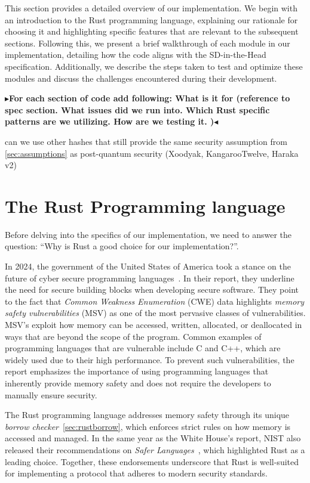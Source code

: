 \documentclass[11pt]{report}
\theoremstyle{definition}
\theoremstyle{plain}
\newcommand{\todo}[1]{{\color[rgb]{.5,0,0}\textbf{$\blacktriangleright$#1$\blacktriangleleft$}}}
\begin{document}
This section provides a detailed overview of our implementation. We begin with an introduction to the Rust programming language, explaining our rationale for choosing it and highlighting specific features that are relevant to the subsequent sections. Following this, we present a brief walkthrough of each module in our implementation, detailing how the code aligns with the SD-in-the-Head specification. Additionally, we describe the steps taken to test and optimize these modules and discuss the challenges encountered during their development.

\todo{For each section of code add following: What is it for (reference to spec section. What issues did we run into. Which Rust specific patterns are we utilizing. How are we testing it. )}

can we use other hashes that still provide the same security assumption from \autoref{sec:assumptions} as post-quantum security (Xoodyak, KangarooTwelve, Haraka v2)

\section{The Rust Programming language}\label{sec:rust}

Before delving into the specifics of our implementation, we need to answer the question: ``Why is Rust a good choice for our implementation?''.

In 2024, the government of the United States of America took a stance on the future of cyber secure programming languages~\cite{whitehouse2024memorysafe}. In their report, they underline the need for secure building blocks when developing secure software. They point to the fact that \textit{Common Weakness Enumeration} (CWE) data highlights \textit{memory safety vulnerabilities} (MSV) as one of the most pervasive classes of vulnerabilities. MSV's exploit how memory can be accessed, written, allocated, or deallocated in ways that are beyond the scope of the program. Common examples of programming languages that are vulnerable include C and C++, which are widely used due to their high performance. To prevent such vulnerabilities, the report emphasizes the importance of using programming languages that inherently provide memory safety and does not require the developers to manually ensure security.

The Rust programming language addresses memory safety through its unique \textit{borrow checker}~\autoref{sec:rustborrow}, which enforces strict rules on how memory is accessed and managed. In the same year as the White House's report, NIST also released their recommendations on \textit{Safer Languages}~\cite{nistsaferlanguages}, which highlighted Rust as a leading choice. Together, these endorsements underscore that Rust is well-suited for implementing a protocol that adheres to modern security standards.
\end{document}
